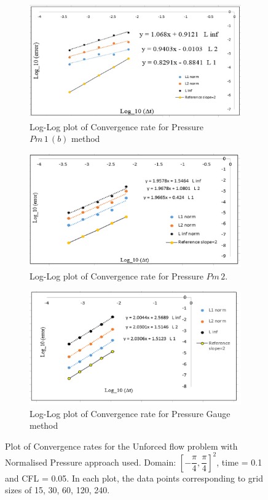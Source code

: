 \begin{figure}[H]
	\centering
	\begin{subfigure}[t]{4.5in}
		\centering
		\includegraphics[width=4.5in]{figures/Pm1b_unf1_np_P_rate.jpg}
		\caption{Log-Log plot of Convergence rate for Pressure $Pm\,1\,(b)$ method}\label{fig:6.19a}		
	\end{subfigure}
	\quad
	\begin{subfigure}[t]{4.5in}
		\centering
		\includegraphics[width=4.5in]{figures/Pm2_unf1_np_P_rate.jpg}
		\caption{Log-Log plot of Convergence rate for Pressure $Pm\,2$. }\label{fig:6.19b}
	\end{subfigure}
	\quad
	\begin{subfigure}[t]{4.5in}
		\centering
		\includegraphics[width=4.5in]{figures/Gauge_unf1_np_P_rate.jpg}
		\caption{Log-Log plot of Convergence rate for Pressure Gauge method }\label{fig:6.19b}
	\end{subfigure}
	\caption{Plot of Convergence rates for the Unforced flow problem with Normalised Pressure approach used. Domain: $[-\dfrac{\pi}{4}, \dfrac{\pi}{4}]^2$, time = 0.1 and CFL = 0.05. In each plot, the data points corresponding to grid sizes of 15, 30, 60, 120, 240.}\label{fig:6.16}
\end{figure}

